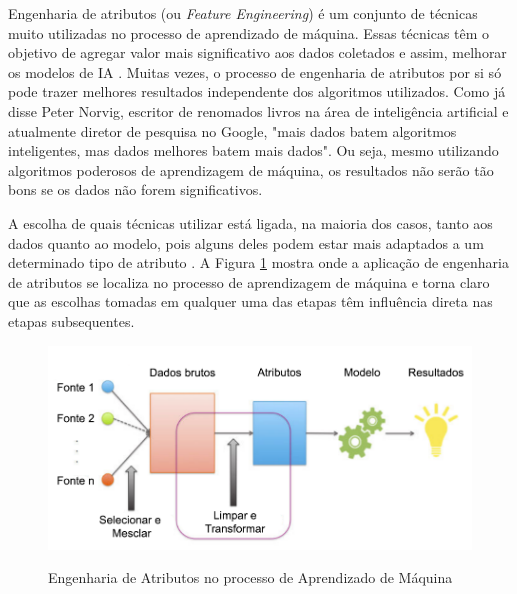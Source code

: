 \documentclass[oneside,openright,12pt]{ufsm_2015} %
\begin{document}
    \par Engenharia de atributos (ou \textit{Feature Engineering}) é um conjunto de técnicas muito utilizadas no processo de aprendizado de máquina. Essas técnicas têm o objetivo de agregar valor mais significativo aos dados coletados e assim, melhorar os modelos de IA \cite{book:zheng:2018}.  Muitas vezes, o processo de engenharia de atributos por si só pode trazer melhores resultados independente dos algoritmos utilizados. Como já disse Peter Norvig, escritor de renomados livros na área de inteligência artificial e atualmente diretor de pesquisa no Google, "mais dados batem algoritmos inteligentes, mas dados melhores batem mais dados". Ou seja, mesmo utilizando algoritmos poderosos de aprendizagem de máquina, os resultados não serão tão bons se os dados não forem significativos.
    
    \par A escolha de quais técnicas utilizar está ligada, na maioria dos casos, tanto aos dados quanto ao modelo, pois alguns deles podem estar mais adaptados a um determinado tipo de atributo \cite{book:zheng:2018}. A Figura \ref{fig:feature-engineering} mostra onde a aplicação de engenharia de atributos se localiza no processo de aprendizagem de máquina e torna claro que as escolhas tomadas em qualquer uma das etapas têm influência direta nas etapas subsequentes.
    
    \begin{figure}[ht]
        \caption{Engenharia de Atributos no processo de Aprendizado de Máquina}
        \centering
        \includegraphics[width=1\textwidth]{figuras/feature-engineering.png}
        \vspace{\baselineskip} %
        \label{fig:feature-engineering}
    \end{figure}
    
\end{document}
